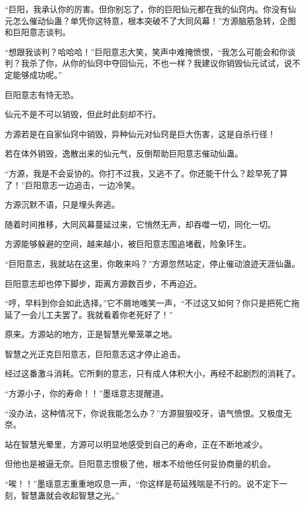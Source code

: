 
\begin{this_body}



“巨阳，我承认你的厉害。但你别忘了，你的巨阳仙元都在我的仙窍内。你没有仙元怎么催动仙蛊？单凭你这特意，根本突破不了大同风幕！”方源脑筋急转，企图和巨阳意志谈判。

“想跟我谈判？哈哈哈！”巨阳意志大笑，笑声中难掩愤恨，“我怎么可能会和你谈判？我杀了你，从你的仙窍中夺回仙元，不也一样？我建议你销毁仙元试试，说不定能够成功呢。”

巨阳意志有恃无恐。

仙元不是不可以销毁，但此时此刻却不行。

方源若是在自家仙窍中销毁，异种仙元对仙窍是巨大伤害，这是自杀行径！

若在体外销毁，逸散出来的仙元气，反倒帮助巨阳意志催动仙蛊。

“方源，我是不会妥协的。你打不过我，又逃不了。你还能干什么？趁早死了算了！”巨阳意志一边追击，一边冷笑。

方源沉默不语，只是埋头奔逃。

随着时间推移，大同风幕蔓延过来，它悄然无声，却吞噬一切，同化一切。

方源能够躲避的空间，越来越小，被巨阳意志围追堵截，险象环生。

“巨阳意志，我就站在这里，你敢来吗？”方源忽然站定，停止催动浪迹天涯仙蛊。

巨阳意志却也停下脚步，距离方源数百步，不再迫近。

“哼，早料到你会如此选择。”它不屑地嗤笑一声，“不过这又如何？你只是把死亡拖延了一会儿工夫罢了。我就看着你老死好了！”

原来。方源站的地方，正是智慧光晕笼罩之地。

智慧之光正克巨阳意志，巨阳意志这才停止追击。

经过这番激斗消耗。它所剩的意志，只有成人体积大小，再经不起剧烈的消耗了。

“方源小子，你的寿命！！”墨瑶意志提醒道。

“没办法，这种情况下，你说我能怎么办？”方源狠狠咬牙，语气愤恨。又极度无奈。

站在智慧光晕里，方源可以明显地感受到自己的寿命，正在不断地减少。

但他也是被逼无奈。巨阳意志恨极了他，根本不给他任何妥协商量的机会。

“唉！！”墨瑶意志重重地叹息一声，“你这样是苟延残喘是不行的。说不定下一刻，智慧蛊就会收起智慧之光。”


\end{this_body}
